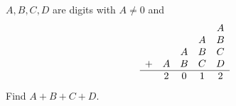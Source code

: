 $A,B,C,D$ are digits with $A\ne0$ and
\[\begin{array}{ccccc}&&&&A\\&&&A&B\\&&A&B&C\\+&A&B&C&D\\\hline&2&0&1&2\end{array}\]
Find $A+B+C+D$.

